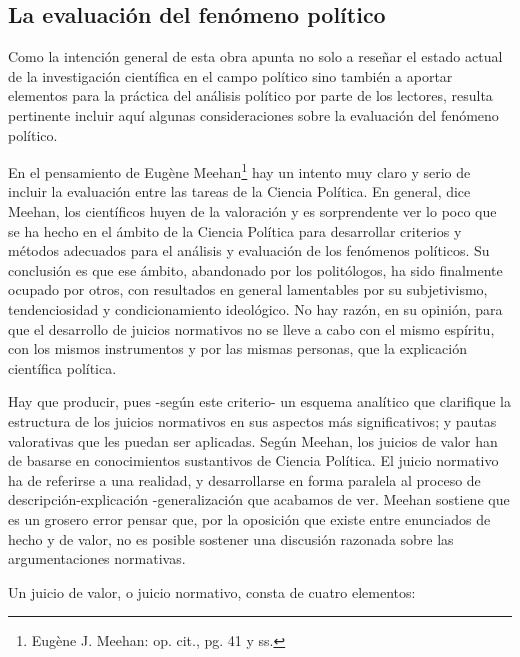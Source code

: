 \documentclass[
]{book}
\begin{document}
\hypertarget{la-evaluaciuxf3n-del-fenuxf3meno-poluxedtico}{%
\subsection*{La evaluación del fenómeno político}\label{la-evaluaciuxf3n-del-fenuxf3meno-poluxedtico}}

Como la intención general de esta obra apunta no solo a reseñar el estado actual de la investigación científica en el campo político sino también a aportar elementos para la práctica del análisis político por parte de los lectores, resulta pertinente incluir aquí algunas consideraciones sobre la evaluación del fenómeno político.

En el pensamiento de Eugène Meehan\footnote{Eugène J. Meehan: op. cit., pg. 41 y ss.} hay un intento muy claro y serio de incluir la evaluación entre las tareas de la Ciencia Política. En general, dice Meehan, los científicos huyen de la valoración y es sorprendente ver lo poco que se ha hecho en el ámbito de la Ciencia Política para desarrollar criterios y métodos adecuados para el análisis y evaluación de los fenómenos políticos. Su conclusión es que ese ámbito, abandonado por los politólogos, ha sido finalmente ocupado por otros, con resultados en general lamentables por su subjetivismo, tendenciosidad y condicionamiento ideológico. No hay razón, en su opinión, para que el desarrollo de juicios normativos no se lleve a cabo con el mismo espíritu, con los mismos instrumentos y por las mismas personas, que la explicación científica política.

Hay que producir, pues -según este criterio- un esquema analítico que clarifique la estructura de los juicios normativos en sus aspectos más significativos; y pautas valorativas que les puedan ser aplicadas. Según Meehan, los juicios de valor han de basarse en conocimientos sustantivos de Ciencia Política. El juicio normativo ha de referirse a una realidad, y desarrollarse en forma paralela al proceso de descripción-explicación -generalización que acabamos de ver. Meehan sostiene que es un grosero error pensar que, por la oposición que existe entre enunciados de hecho y de valor, no es posible sostener una discusión razonada sobre las argumentaciones normativas.

Un juicio de valor, o juicio normativo, consta de cuatro elementos:
\end{document}
